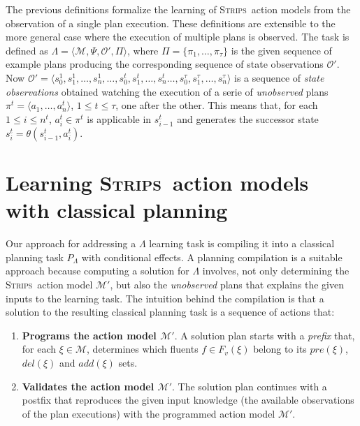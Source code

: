 \documentclass[3p,times]{elsarticle}
\newcommand{\strips}{\textsc{Strips}}     %
\newcommand{\tup}[1]{{\langle #1 \rangle}}
\begin{document}
The previous definitions formalize the learning of \strips\ action models from the observation of a single plan execution. These definitions are extensible to the more general case where the execution of multiple plans is observed. The task is defined as $\Lambda=\tup{\mathcal{M},\Psi,\mathcal{O'},\Pi}$, where $\Pi=\{\pi_1,\ldots,\pi_{\tau}\}$ is the given sequence of example plans producing the corresponding sequence of state observations $\mathcal{O'}$. Now $\mathcal{O'}=\tup{s_0^1,s_1^1,\ldots,s_{n}^1,\ldots,s_0^t,s_1^t,\ldots,s_{n}^t\ldots,s_0^{\tau},s_1^{\tau},\ldots,s_{n}^{\tau}}$ is a sequence of {\em state observations} obtained watching the execution of a serie of {\em unobserved} plans $\pi^t=\tup{a_1, \ldots, a_n^t}$, {\tt\small $1\leq t\leq \tau$}, one after the other. This means that, for each {\small $1\leq i\leq n^t$}, $a_i^t\in \pi^t$ is applicable in $s_{i-1}^t$ and generates the successor state $s_i^t=\theta(s_{i-1}^t,a_i^t)$.



\section{Learning \strips\ action models with classical planning}
\label{sec:Section5}
Our approach for addressing a $\Lambda$ learning task is compiling it into a classical planning task $P_{\Lambda}$ with conditional effects. A planning compilation is a suitable approach because computing a solution for $\Lambda$ involves, not only determining the \strips\ action model $\mathcal{M}'$, but also the {\em unobserved} plans that explains the given inputs to the learning task. The intuition behind the compilation is that a solution to the resulting classical planning task is a sequence of actions that:

\begin{enumerate}
\item {\bf Programs the action model $\mathcal{M}'$}. A solution plan starts with a {\em prefix} that, for each $\xi\in\mathcal{M}$, determines which fluents $f\in F_v(\xi)$ belong to its $pre(\xi)$, $del(\xi)$ and $add(\xi)$ sets.
\item {\bf Validates the action model $\mathcal{M}'$}. The solution plan continues with a postfix that reproduces the given input knowledge (the available observations of the plan executions) with the programmed action model $\mathcal{M}'$.
\end{enumerate}
\end{document}
